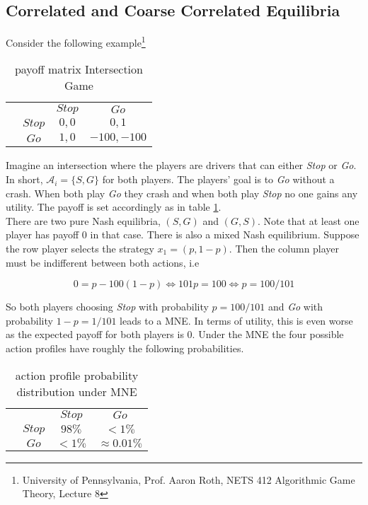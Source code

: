 \subsection{Correlated and Coarse Correlated Equilibria}\label{subsection:CEandCCE}

Consider the following example\footnote{University of Pennsylvania, Prof. Aaron Roth, NETS 412 Algorithmic Game Theory, Lecture 8}

\begin{table}[H]\centering
\setlength{\extrarowheight}{2pt}
\begin{tabular}{cc|c|c|}
  & \multicolumn{1}{c}{} & \multicolumn{1}{c}{$Stop$}  & \multicolumn{1}{c}{$Go$} \\\cline{3-4}
  & $Stop$ & $0,0$ & $0,1$ \\\cline{3-4}
  & $Go$ & $1,0$ & $-100,-100$ \\\cline{3-4}
\end{tabular}\caption{\label{tab:payoffIntersectionfromFiniteGames}payoff matrix Intersection Game}
\end{table}

Imagine an intersection where the players are drivers that can either \textit{Stop} or \textit{Go}. In short, $\mathcal{A}_i = \{S,G\}$ for both players. The players' goal is to \textit{Go} without a crash. When both play \textit{Go} they crash and when both play \textit{Stop} no one gains any utility. The payoff is set accordingly as in table \ref{tab:payoffIntersectionfromFiniteGames}. \\

There are two pure Nash equilibria, $(S,G)$ and $(G,S)$. Note that at least one player has payoff $0$ in that case. There is also a mixed Nash equilibrium. Suppose the row player selects the strategy $x_1 = (p,1-p)$. Then the column player must be indifferent between both actions, i.e 

\begin{equation*}
    0 = p - 100(1-p) \iff 101p = 100 \iff p = 100/101
\end{equation*}

So both players choosing \textit{Stop} with probability $p = 100/101$ and \textit{Go} with probability $1-p = 1/101$  leads to a MNE. In terms of utility, this is even worse as the expected payoff for both players is $0$. Under the MNE the four possible action
profiles have roughly the following probabilities. 

\begin{table}[H]\centering
\setlength{\extrarowheight}{2pt}
\begin{tabular}{cc|c|c|}
  & \multicolumn{1}{c}{} & \multicolumn{1}{c}{$Stop$}  & \multicolumn{1}{c}{$Go$} \\\cline{3-4}
  & $Stop$ & $98\%$ & $<1\%$ \\\cline{3-4}
  & $Go$ & $<1\%$ & $\approx 0.01\%$ \\\cline{3-4}
\end{tabular}\caption{\label{tab:probabilityUnderMNE}action profile probability distribution under MNE}
\end{table}

